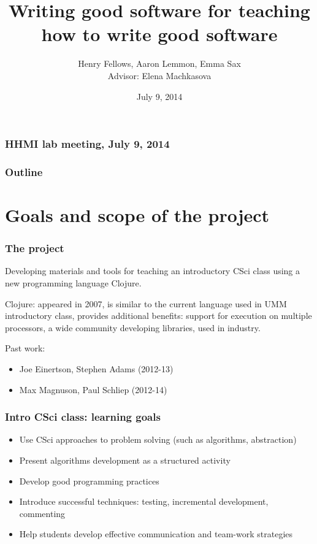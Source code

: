 \documentclass{beamer}
\begin{document}
\author[Henry Fellows, Aaron Lemmon, Emma Sax]
{Henry Fellows, Aaron Lemmon, Emma Sax
\\ Advisor: Elena Machkasova}
\title{Writing good software for teaching how to write good software}
\date{July 9, 2014}

\begin{frame}
\frametitle{HHMI lab meeting, July 9, 2014}

\maketitle

\end{frame}

\begin{frame}[fragile]
\frametitle{Outline}
	\tableofcontents
\end{frame}


\section{Goals and scope of the project}

\begin{frame}[fragile]
\frametitle{The project}
Developing materials and tools for teaching an introductory CSci class using a new programming language Clojure.

Clojure: appeared in 2007, is similar to the current language used in UMM introductory class, provides additional benefits:
support for execution on multiple processors, a wide community developing libraries, used in industry.

Past work: 
\begin{itemize}
\item Joe Einertson, Stephen Adams (2012-13)
\item  Max Magnuson, Paul Schliep (2012-14)
\end{itemize}  
\end{frame}

\begin{frame}[fragile]
\frametitle{Intro CSci class: learning goals}
\begin{itemize}
\item Use CSci approaches to problem solving (such as algorithms, abstraction)
\item Present algorithms development as a structured activity
\item Develop good programming practices
\item Introduce successful techniques: testing, incremental development, commenting 
\item Help students develop effective communication and  team-work strategies
\end{itemize}
\end{frame}
\end{document}

